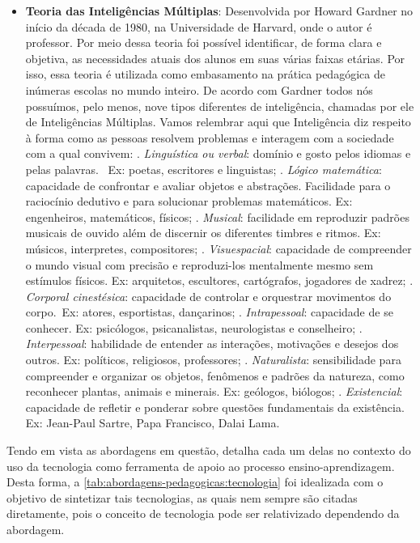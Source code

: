 \begin{itemize}
    \item \textbf{Teoria das Inteligências Múltiplas}: Desenvolvida por Howard Gardner no início da década de 1980, na Universidade de Harvard, onde o autor é professor. Por meio dessa teoria foi possível identificar, de forma clara e objetiva, as necessidades atuais dos alunos em suas várias faixas etárias. Por isso, essa teoria é utilizada como embasamento na prática pedagógica de inúmeras escolas no mundo inteiro. De acordo com Gardner todos nós possuímos, pelo menos, nove tipos diferentes de inteligência, chamadas por ele de Inteligências Múltiplas. Vamos relembrar aqui que Inteligência diz respeito à forma como as pessoas resolvem problemas e interagem com a sociedade com a qual convivem:
    . \textit{Linguística ou verbal}: domínio e gosto pelos idiomas e pelas palavras.  Ex: poetas, escritores e linguistas;
    . \textit{Lógico matemática}:  capacidade de confrontar e avaliar objetos e abstrações. Facilidade para o raciocínio dedutivo e para solucionar problemas matemáticos. Ex: engenheiros, matemáticos, físicos;
    . \textit{Musical}: facilidade em reproduzir padrões musicais de ouvido além de discernir os diferentes timbres e ritmos. Ex: músicos, interpretes, compositores;
    . \textit{Visuespacial}: capacidade de compreender o mundo visual com precisão e reproduzi-los mentalmente mesmo sem estímulos físicos. Ex: arquitetos, escultores, cartógrafos, jogadores de xadrez;
    . \textit{Corporal cinestésica}: capacidade de controlar e orquestrar movimentos do corpo. Ex: atores, esportistas, dançarinos;
    . \textit{Intrapessoal}: capacidade de se conhecer. Ex: psicólogos, psicanalistas, neurologistas e conselheiro;
    . \textit{Interpessoal}: habilidade de entender as interações, motivações e desejos dos outros. Ex: políticos, religiosos, professores;
    . \textit{Naturalista}: sensibilidade para compreender e organizar os objetos, fenômenos e padrões da natureza, como reconhecer plantas, animais e minerais. Ex: geólogos, biólogos;
    . \textit{Existencial}: capacidade de refletir e ponderar sobre questões fundamentais da existência. Ex: Jean-Paul Sartre, Papa Francisco, Dalai Lama. 
\end{itemize}

Tendo em vista as abordagens em questão,  detalha cada um delas no contexto do uso da tecnologia como ferramenta de apoio ao processo ensino-aprendizagem. Desta forma, a \autoref{tab:abordagens-pedagogicas:tecnologia} foi idealizada com o objetivo de sintetizar tais tecnologias, as quais nem sempre são citadas diretamente, pois o conceito de tecnologia pode ser relativizado dependendo da abordagem.

